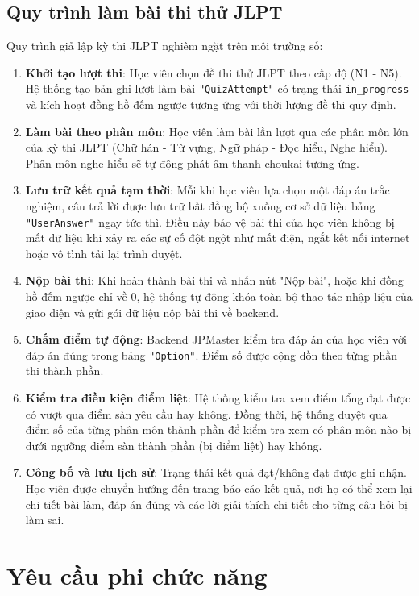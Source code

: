 \documentclass[../DoAn.tex]{subfiles}
\begin{document}
\subsection{Quy trình làm bài thi thử JLPT}
Quy trình giả lập kỳ thi JLPT nghiêm ngặt trên môi trường số:
\begin{enumerate}
    \item \textbf{Khởi tạo lượt thi}: Học viên chọn đề thi thử JLPT theo cấp độ (N1 - N5). Hệ thống tạo bản ghi lượt làm bài \texttt{"QuizAttempt"} có trạng thái \texttt{in\_progress} và kích hoạt đồng hồ đếm ngược tương ứng với thời lượng đề thi quy định.
    \item \textbf{Làm bài theo phân môn}: Học viên làm bài lần lượt qua các phân môn lớn của kỳ thi JLPT (Chữ hán - Từ vựng, Ngữ pháp - Đọc hiểu, Nghe hiểu). Phân môn nghe hiểu sẽ tự động phát âm thanh choukai tương ứng.
    \item \textbf{Lưu trữ kết quả tạm thời}: Mỗi khi học viên lựa chọn một đáp án trắc nghiệm, câu trả lời được lưu trữ bất đồng bộ xuống cơ sở dữ liệu bảng \texttt{"UserAnswer"} ngay tức thì. Điều này bảo vệ bài thi của học viên không bị mất dữ liệu khi xảy ra các sự cố đột ngột như mất điện, ngắt kết nối internet hoặc vô tình tải lại trình duyệt.
    \item \textbf{Nộp bài thi}: Khi hoàn thành bài thi và nhấn nút "Nộp bài", hoặc khi đồng hồ đếm ngược chỉ về 0, hệ thống tự động khóa toàn bộ thao tác nhập liệu của giao diện và gửi gói dữ liệu nộp bài thi về backend.
    \item \textbf{Chấm điểm tự động}: Backend JPMaster kiểm tra đáp án của học viên với đáp án đúng trong bảng \texttt{"Option"}. Điểm số được cộng dồn theo từng phần thi thành phần.
    \item \textbf{Kiểm tra điều kiện điểm liệt}: Hệ thống kiểm tra xem điểm tổng đạt được có vượt qua điểm sàn yêu cầu hay không. Đồng thời, hệ thống duyệt qua điểm số của từng phân môn thành phần để kiểm tra xem có phân môn nào bị dưới ngưỡng điểm sàn thành phần (bị điểm liệt) hay không.
    \item \textbf{Công bố và lưu lịch sử}: Trạng thái kết quả đạt/không đạt được ghi nhận. Học viên được chuyển hướng đến trang báo cáo kết quả, nơi họ có thể xem lại chi tiết bài làm, đáp án đúng và các lời giải thích chi tiết cho từng câu hỏi bị làm sai.
\end{enumerate}

\section{Yêu cầu phi chức năng}
\label{section:2.4}
\end{document}
